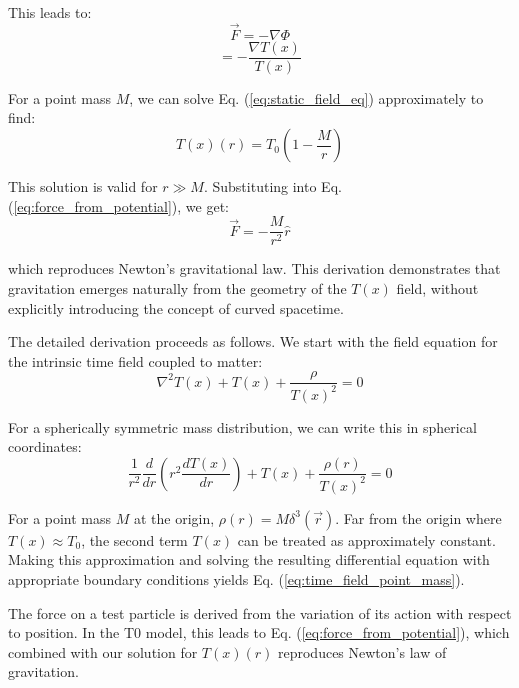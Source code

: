 \documentclass[12pt,a4paper]{article} %
\newcommand{\Tfield}{T(x)}
\newcommand{\Tzero}{T_0}
\begin{document}
	This leads to:
	\begin{equation}
		\vec{F} = -\nabla\Phi
		\label{eq:force_from_potential_part1}
	\end{equation}
	\begin{equation}
		= -\frac{\nabla\Tfield}{\Tfield}
		\label{eq:force_from_potential_part2}
	\end{equation}
	
	For a point mass $M$,
	we can solve Eq. (\ref{eq:static_field_eq}) approximately to find:
	\begin{equation}
		\Tfield(r) = \Tzero\left(1 - \frac{M}{r}\right)
		\label{eq:time_field_point_mass}
	\end{equation}
	
	This solution is valid for $r \gg M$. 
	Substituting into Eq. (\ref{eq:force_from_potential}),
	we get:
	\begin{equation}
		\vec{F} = -\frac{M}{r^2} \hat{r}
		\label{eq:newton_law}
	\end{equation}
	
	which reproduces Newton's gravitational law. 
	This derivation demonstrates that gravitation emerges naturally
	from the geometry of the $\Tfield$ field,
	without explicitly introducing the concept of curved spacetime.
	
	The detailed derivation proceeds as follows. 
	We start with the field equation for the intrinsic time field coupled to matter:
	\begin{equation}
		\nabla^2\Tfield + \Tfield + \frac{\rho}{\Tfield^2} = 0
		\label{eq:field_eq_spherical_part1}
	\end{equation}
	
	For a spherically symmetric mass distribution,
	we can write this in spherical coordinates:
	\begin{equation}
		\frac{1}{r^2}\frac{d}{dr}\left(r^2\frac{d\Tfield}{dr}\right) + \Tfield + \frac{\rho(r)}{\Tfield^2} = 0
		\label{eq:field_eq_spherical_part2}
	\end{equation}
	
	For a point mass $M$ at the origin,
	$\rho(r) = M\delta^3(\vec{r})$. 
	Far from the origin where $\Tfield \approx \Tzero$,
	the second term $\Tfield$ can be treated as approximately constant. 
	Making this approximation and solving the resulting differential equation
	with appropriate boundary conditions yields Eq. (\ref{eq:time_field_point_mass}).
	
	The force on a test particle is derived from the variation of its action
	with respect to position. 
	In the T0 model, this leads to Eq. (\ref{eq:force_from_potential}),
	which combined with our solution for $\Tfield(r)$
	reproduces Newton's law of gravitation.
\end{document}
